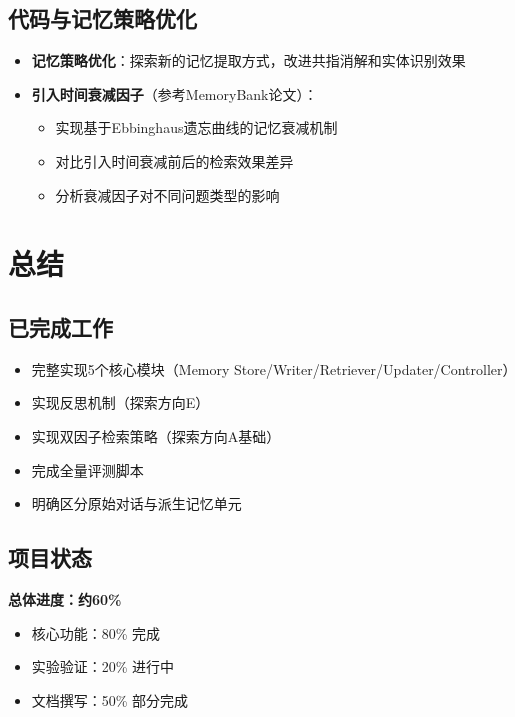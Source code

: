 \documentclass[11pt]{article}
\begin{document}
\subsection{代码与记忆策略优化}

\begin{itemize}
    \item \textbf{记忆策略优化}：探索新的记忆提取方式，改进共指消解和实体识别效果
    \item \textbf{引入时间衰减因子}（参考MemoryBank论文）：
    \begin{itemize}
        \item 实现基于Ebbinghaus遗忘曲线的记忆衰减机制
        \item 对比引入时间衰减前后的检索效果差异
        \item 分析衰减因子对不同问题类型的影响
    \end{itemize}
\end{itemize}

\section{总结}

\subsection{已完成工作}

\begin{itemize}
    \item \checkmark 完整实现5个核心模块（Memory Store/Writer/Retriever/Updater/Controller）
    \item \checkmark 实现反思机制（探索方向E）
    \item \checkmark 实现双因子检索策略（探索方向A基础）
    \item \checkmark 完成全量评测脚本
    \item \checkmark 明确区分原始对话与派生记忆单元
\end{itemize}

\subsection{项目状态}

\textbf{总体进度：约60\%}

\begin{itemize}
    \item 核心功能：80\% 完成
    \item 实验验证：20\% 进行中
    \item 文档撰写：50\% 部分完成
\end{itemize}
\end{document}
